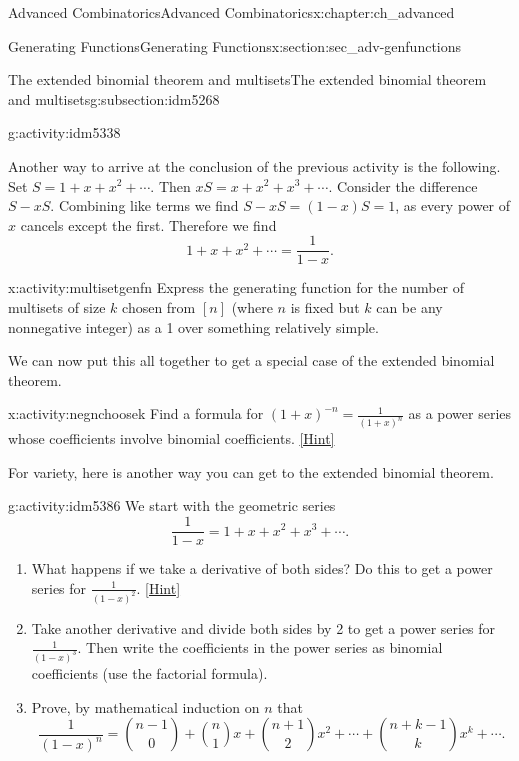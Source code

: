 \documentclass[oneside,10pt,]{book}
\numberwithin{equation}{chapter}
\begin{document}
\begin{chapterptx}{Advanced Combinatorics}{}{Advanced Combinatorics}{}{}{x:chapter:ch_advanced}
\begin{sectionptx}{Generating Functions}{}{Generating Functions}{}{}{x:section:sec_adv-genfunctions}
\begin{subsectionptx}{The extended binomial theorem and multisets}{}{The extended binomial theorem and multisets}{}{}{g:subsection:idm5268}
\begin{activity}{}{g:activity:idm5338}
\end{activity}
Another way to arrive at the conclusion of the previous activity is the following.  Set \(S = 1 + x + x^2 + \cdots\).  Then \(xS = x + x^2 + x^3 + \cdots\).  Consider the difference \(S - xS\).  Combining like terms we find \(S-xS = (1-x)S = 1\), as every power of \(x\) cancels except the first.  Therefore we find%
\begin{equation*}
1 + x + x^2 + \cdots = \frac{1}{1-x}\text{.}
\end{equation*}
%
\begin{activity}{}{x:activity:multisetgenfn}%
Express the generating function for the number of multisets of size \(k\) chosen from \([n]\) (where \(n\) is fixed but \(k\) can be any nonnegative integer) as a 1 over something relatively simple.%
\end{activity}
We can now put this all together to get a special case of the extended binomial theorem.%
\begin{activity}{}{x:activity:negnchoosek}%
Find a formula for \((1+x)^{-n} = \frac{1}{(1+x)^n}\) as a power series whose coefficients involve binomial coefficients.%
\space\hspace*{0pt}\hfill{\tiny\hyperlink{g:hint:idm5374-back}{[Hint]}}\end{activity}
For variety, here is another way you can get to the extended binomial theorem.%
\begin{activity}{}{g:activity:idm5386}%
We start with the geometric series%
\begin{equation*}
\frac{1}{1-x} = 1 + x + x^2 + x^3+ \cdots\text{.}
\end{equation*}
%
\begin{enumerate}[font=\bfseries,label=(\alph*),ref=\alph*]
\item{}What happens if we take a derivative of both sides?  Do this to get a power series for \(\frac{1}{(1-x)^2}\).%
\space\hspace*{0pt}\hfill{\tiny\hyperlink{g:hint:idm5394-back}{[Hint]}}\item{}Take another derivative and divide both sides by 2 to get a power series for \(\frac{1}{(1-x)^3}\).  Then write the coefficients in the power series as binomial coefficients (use the factorial formula).%
\item{}Prove, by mathematical induction on \(n\) that%
\begin{equation*}
\frac{1}{(1-x)^{n}} = \binom{n-1}{0} + \binom{n}{1}x + \binom{n+1}{2}x^2 + \cdots + \binom{n+k-1}{k}x^k+ \cdots\text{.}
\end{equation*}

\end{enumerate}
\end{activity}
\end{subsectionptx}
\end{sectionptx}
\end{chapterptx}
\end{document}
